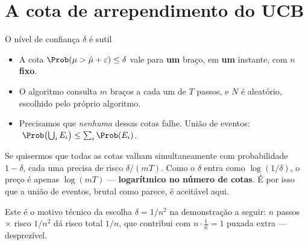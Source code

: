 \documentclass[aspectratio=169, 10pt]{beamer}
\newcommand{\muhat}{\hat{\mu}}
\newcommand{\Nc}{N}                         %
\begin{document}
\section{A cota de arrependimento do UCB}

\begin{frame}{O nível de confiança $\delta$ é sutil}
  \begin{itemize}
    \item A cota $\Prob(\mu > \muhat + \varepsilon) \le \delta$ vale para
          \textbf{um} braço, em \textbf{um} instante, com $n$ \textbf{fixo}.
    \item O algoritmo consulta $m$ braços a cada um de $T$ passos, e $\Nc$
          é aleatório, escolhido pelo próprio algoritmo.
    \item Precisamos que \emph{nenhuma} dessas cotas falhe. União de
          eventos:
          $\;\Prob\bigl(\bigcup_i E_i\bigr) \le \sum_i \Prob(E_i)$.
  \end{itemize}

  \begin{alertabox}
    Se quisermos que todas as cotas valham simultaneamente com
    probabilidade $1 - \delta$, cada uma precisa de risco $\delta/(mT)$.
    Como o $\delta$ entra como $\log(1/\delta)$, o preço é apenas
    $\log(mT)$ --- \textbf{logarítmico no número de cotas}. É por isso que
    a união de eventos, brutal como parece, é aceitável aqui.
  \end{alertabox}

  \begin{ideiabox}
    Este é o motivo técnico da escolha $\delta = 1/n^2$ na demonstração a
    seguir: $n$ passos $\times$ risco $1/n^2$ dá risco total $1/n$, que
    contribui com $n \cdot \frac1n = 1$ puxada extra --- desprezível.
  \end{ideiabox}
\end{frame}
\end{document}
